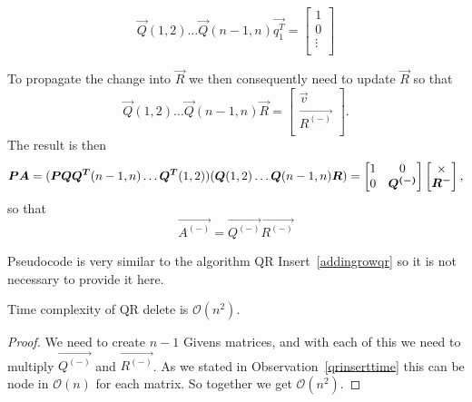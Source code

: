 \begin{equation}
    \vec{Q}(1,2) \ldots \vec{Q}(n-1,n)\vec{q_1^T} =     \begin{bmatrix}
        1 \\
        0\\
        \vdots \\
    \end{bmatrix}
\end{equation}

To propagate the change into $\vec{R}$ we then consequently need to update $\vec{R}$ so that
\begin{equation}
    \vec{Q}(1,2) \ldots \vec{Q}(n-1,n) \vec{R} =   \begin{bmatrix}
        \vec{v} \\
        \vec{R^{(-)}}\\
    \end{bmatrix}.
\end{equation}
The result is then
\begin{equation}
    \vec{P}\vec{A} = (\vec{P}\vec{Q}  \vec{Q^T}(n-1,n) \ldots   \vec{Q^T}(1,2)) (\vec{Q}(1,2) \ldots \vec{Q}(n-1,n) \vec{R} ) \\
    = 
    \begin{bmatrix}
        1 & 0 \\
        0 & \vec{Q^{(-)}}
    \end{bmatrix}
    \begin{bmatrix}
        \times \\
        \vec{R^{-}}
    \end{bmatrix},
\end{equation}
so that 
\begin{equation}
    \vec{A^{(-)}} = \vec{Q^{(-)}}\vec{R^{(-)}}
\end{equation}

Pseudocode is very similar to the algorithm QR Insert~\ref{addingrowqr} so it is not necessary to provide it here.

\begin{observation} \label{qrdeletetime}
Time complexity of QR delete is   $\mathcal{O}(n^2)$.
\end{observation}

\begin{proof}
We need to create $n-1$ Givens matrices, and with each of this we need to multiply $\vec{Q^{(-)}}$ and $\vec{R^{(-)}}$. As we stated in Observation~\ref{qrinserttime} this can be node in $\mathcal{O}(n)$ for each matrix.
So together we get $\mathcal{O}(n^2)$.
\end{proof}

